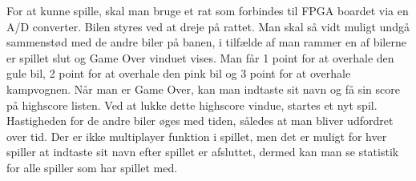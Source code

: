 For at kunne spille, skal man bruge et rat som forbindes til FPGA boardet via en A/D converter. Bilen styres ved at dreje på rattet.
Man skal så vidt muligt undgå sammenstød med de andre biler på banen, i tilfælde af man rammer en af bilerne er spillet slut og Game Over vinduet vises. Man får 1 point for at overhale den gule bil, 2 point for at overhale den pink bil og 3 point for at overhale kampvognen. Når man er Game Over, kan man indtaste sit navn og få sin score på highscore listen. Ved at lukke dette highscore vindue, startes et nyt spil.
Hastigheden for de andre biler øges med tiden, således at man bliver udfordret over tid. 
Der er ikke multiplayer funktion i spillet, men det er muligt for hver spiller at indtaste sit navn efter spillet er afsluttet, dermed kan man se statistik for alle spiller som har spillet med.